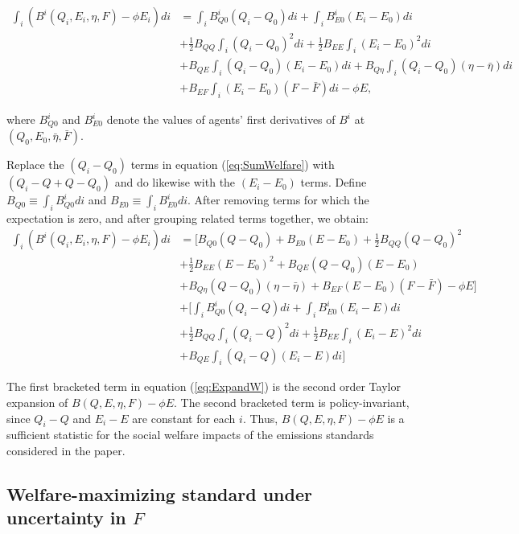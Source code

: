 \documentclass[12pt]{article}
\begin{document}
\begin{align}
\int_i (B^i(Q_i,E_i,\eta,F)-\phi E_i)di &= \int_i B_{Q0}^i(Q_i-Q_0)di + \int_i B_{E0}^i(E_i-E_0)di \nonumber \\
&+ \frac{1}{2}B_{QQ}\int_i (Q_i-Q_0)^2di + \frac{1}{2}B_{EE}\int_i (E_i-E_0)^2di \nonumber \\
&+ B_{QE}\int_i (Q_i-Q_0)(E_i-E_0)di + B_{Q\eta}\int_i(Q_i-Q_0)(\eta-\bar{\eta})di \nonumber \\
&+ B_{EF}\int_i (E_i-E_0)(F-\bar{F})di - \phi E, \label{eq:SumWelfare}
\end{align}

where $B_{Q0}^i$ and $B_{E0}^i$ denote the values of agents' first derivatives of $B^i$ at $(Q_0,E_0,\bar{\eta},\bar{F})$.

Replace the $(Q_i-Q_0)$ terms in equation (\ref{eq:SumWelfare}) with $(Q_i-Q+Q-Q_0)$ and do likewise with the $(E_i-E_0)$ terms. Define $B_{Q0}\equiv\int_iB_{Q0}^idi$ and $B_{E0}\equiv\int_iB_{E0}^idi$. After removing terms for which the expectation is zero, and after grouping related terms together, we obtain:
\begin{align}
\int_i (B^i(Q_i,E_i,\eta,F)-\phi E_i)di &= [B_{Q0}(Q-Q_0)+B_{E0}(E-E_0)+\frac{1}{2}B_{QQ}(Q-Q_0)^2 \nonumber \\
&+\frac{1}{2}B_{EE}(E-E_0)^2 + B_{QE}(Q-Q_0)(E-E_0) \nonumber \\
&+ B_{Q\eta}(Q-Q_0)(\eta-\bar{\eta}) + B_{EF}(E-E_0)(F-\bar{F}) - \phi E] \nonumber \\
&+[\int_i B_{Q0}^i(Q_i-Q)di +\int_i B_{E0}^i(E_i-E)di \nonumber \\
&+ \frac{1}{2}B_{QQ}\int_i (Q_i-Q)^2di + \frac{1}{2}B_{EE}\int_i (E_i-E)^2di \nonumber \\
&+ B_{QE}\int_i (Q_i-Q)(E_i-E)di] \label{eq:ExpandW}
\end{align}

The first bracketed term in equation (\ref{eq:ExpandW}) is the second order Taylor expansion of $B(Q,E,\eta,F)-\phi E$. The second bracketed term is policy-invariant, since $Q_i-Q$ and $E_i-E$ are constant for each $i$. Thus, $B(Q,E,\eta,F)-\phi E$ is a sufficient statistic for the social welfare impacts of the emissions standards considered in the paper.




\subsection{Welfare-maximizing standard under uncertainty in $F$} \label{appx:Funcert}
\end{document}
